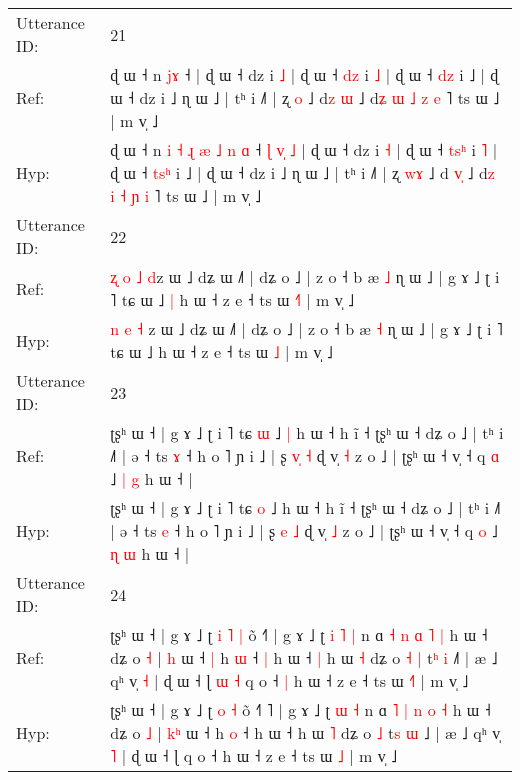 \documentclass[10pt]{article}
\DeclareRobustCommand{\hl}[1]{{\textcolor{red}{#1}}}
\begin{document}
\begin{longtable}{ll}
 \\
\midrule
Utterance ID: & 21 \\
Ref: & ɖ ɯ ˧ n\hl{}\hl{}\hl{}\hl{}\hl{}\hl{}\hl{}\hl{}\hl{}\hl{} \hl{}\hl{j}\hl{ɤ} ˧\hl{}\hl{}\hl{}\hl{}\hl{}\hl{}\hl{} | ɖ ɯ ˧ dz i \hl{˩} | ɖ ɯ ˧ \hl{}\hl{d}\hl{z} i \hl{˩} | ɖ ɯ ˧ \hl{}\hl{d}\hl{z} i ˩ | ɖ ɯ ˧ dz i ˩ ɳ ɯ ˩ | tʰ i ˩˥ | ʐ \hl{}\hl{o} ˩ d\hl{z}\hl{ }\hl{ɯ} ˩ d\hl{ʑ} \hl{ɯ} \hl{˩} \hl{z} \hl{e} ˥ ts ɯ ˩ | m v̩ ˩
 \\
Hyp: & ɖ ɯ ˧ n\hl{ }\hl{i}\hl{ }\hl{˧}\hl{ }\hl{ɻ}\hl{ }\hl{æ}\hl{ }\hl{˩} \hl{n}\hl{ }\hl{ɑ} ˧\hl{ }\hl{ɭ}\hl{ }\hl{v}\hl{̩}\hl{ }\hl{˩} | ɖ ɯ ˧ dz i \hl{˧} | ɖ ɯ ˧ \hl{t}\hl{s}\hl{ʰ} i \hl{˥} | ɖ ɯ ˧ \hl{t}\hl{s}\hl{ʰ} i ˩ | ɖ ɯ ˧ dz i ˩ ɳ ɯ ˩ | tʰ i ˩˥ | ʐ \hl{w}\hl{ɤ} ˩ d\hl{ }\hl{v}\hl{̩} ˩ d\hl{z} \hl{i} \hl{˧} \hl{ɲ} \hl{i} ˥ ts ɯ ˩ | m v̩ ˩
 \\
\midrule
Utterance ID: & 22 \\
Ref: & \hl{ʐ} \hl{o} \hl{˩} \hl{d}z ɯ ˩ dʑ ɯ ˩˥ | dʑ o ˩ | z o ˧ b æ \hl{˩} ɳ ɯ ˩ | g ɤ ˩ ʈ i ˥ tɕ ɯ ˩\hl{ }\hl{|} h ɯ ˧ z e ˧ ts ɯ \hl{˧}\hl{˥} | m v̩ ˩
 \\
Hyp: & \hl{n} \hl{e} \hl{˧} \hl{}z ɯ ˩ dʑ ɯ ˩˥ | dʑ o ˩ | z o ˧ b æ \hl{˧} ɳ ɯ ˩ | g ɤ ˩ ʈ i ˥ tɕ ɯ ˩\hl{}\hl{} h ɯ ˧ z e ˧ ts ɯ \hl{}\hl{˩} | m v̩ ˩
 \\
\midrule
Utterance ID: & 23 \\
Ref: & ʈʂʰ ɯ ˧ | g ɤ ˩ ʈ i ˥ tɕ \hl{ɯ} ˩\hl{ }\hl{|} h ɯ ˧ h ĩ ˧ ʈʂʰ ɯ ˧ dʑ o ˩ | tʰ i ˩˥ | ə ˧ ts \hl{ɤ} ˧ h o ˥ ɲ i ˩ | ʂ \hl{v}\hl{̩} \hl{˧} ɖ v̩ \hl{˧} z o ˩ | ʈʂʰ ɯ ˧ v̩ ˧ q \hl{ɑ} ˩ \hl{|} \hl{g} h ɯ ˧ |
 \\
Hyp: & ʈʂʰ ɯ ˧ | g ɤ ˩ ʈ i ˥ tɕ \hl{o} ˩\hl{}\hl{} h ɯ ˧ h ĩ ˧ ʈʂʰ ɯ ˧ dʑ o ˩ | tʰ i ˩˥ | ə ˧ ts \hl{e} ˧ h o ˥ ɲ i ˩ | ʂ \hl{}\hl{e} \hl{˩} ɖ v̩ \hl{˩} z o ˩ | ʈʂʰ ɯ ˧ v̩ ˧ q \hl{o} ˩ \hl{ɳ} \hl{ɯ} h ɯ ˧ |
 \\
\midrule
Utterance ID: & 24 \\
Ref: & ʈʂʰ ɯ ˧ | g ɤ ˩ ʈ\hl{ }\hl{i} \hl{˥} \hl{|} õ ˧\hl{}\hl{}˥ | g ɤ ˩ ʈ\hl{ }\hl{i} \hl{˥} \hl{|} n ɑ \hl{˧} \hl{n} \hl{ɑ} \hl{˥} \hl{|} h ɯ ˧ dʑ o \hl{˧} | \hl{}\hl{h} ɯ ˧\hl{ }\hl{|} h \hl{ɯ} ˧\hl{ }\hl{|} h ɯ ˧\hl{ }\hl{|} h ɯ \hl{˧} dʑ o\hl{ }\hl{˧} \hl{|} t\hl{ʰ} \hl{i} ˩\hl{˥} | æ ˩ qʰ v̩ \hl{˧} | ɖ ɯ ˧ ɭ\hl{ }\hl{ɯ}\hl{ }\hl{˧} q o ˧\hl{ }\hl{|} h ɯ ˧ z e ˧ ts ɯ \hl{˧}\hl{˥} | m v̩ ˩
 \\
Hyp: & ʈʂʰ ɯ ˧ | g ɤ ˩ ʈ\hl{}\hl{} \hl{o} \hl{˧} õ ˧\hl{˥}\hl{ }˥ | g ɤ ˩ ʈ\hl{}\hl{} \hl{ɯ} \hl{˧} n ɑ \hl{˥} \hl{|} \hl{n} \hl{o} \hl{˧} h ɯ ˧ dʑ o \hl{˩} | \hl{k}\hl{ʰ} ɯ ˧\hl{}\hl{} h \hl{o} ˧\hl{}\hl{} h ɯ ˧\hl{}\hl{} h ɯ \hl{˥} dʑ o\hl{}\hl{} \hl{˩} t\hl{s} \hl{ɯ} ˩\hl{} | æ ˩ qʰ v̩ \hl{˥} | ɖ ɯ ˧ ɭ\hl{}\hl{}\hl{}\hl{} q o ˧\hl{}\hl{} h ɯ ˧ z e ˧ ts ɯ \hl{}\hl{˩} | m v̩ ˩

\end{longtable}
\end{document}
